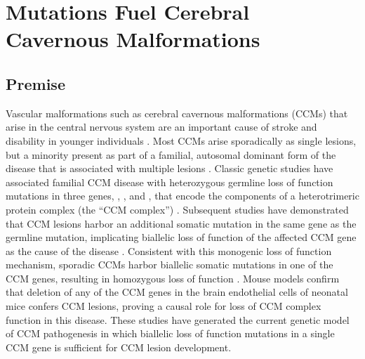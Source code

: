 \chapter{ Mutations Fuel Cerebral Cavernous Malformations}
\label{chap:pik3ca}

\clearpage

\section{Premise}
Vascular malformations such as cerebral cavernous malformations (CCMs) that arise in the central nervous system are an important cause of stroke and disability in younger individuals \citep{heiskanen1993, fischer2013}.  Most CCMs arise sporadically as single lesions, but a minority present as part of a familial, autosomal dominant form of the disease that is associated with multiple lesions \citep{cavalcanti2012}. Classic genetic studies have associated familial CCM disease with heterozygous germline loss of function mutations in three genes, , , and , that encode the components of a heterotrimeric protein complex (the “CCM complex”) \citep{fisher2014, plummer2005}. Subsequent studies have demonstrated that CCM lesions harbor an additional somatic mutation in the same gene as the germline mutation, implicating biallelic loss of function of the affected CCM gene as the cause of the disease \citep{gault2005, akers2009}. Consistent with this monogenic loss of function mechanism, sporadic CCMs harbor biallelic somatic mutations in one of the CCM genes, resulting in homozygous loss of function \citep{mcdonald2014}. Mouse models confirm that deletion of any of the CCM genes in the brain endothelial cells of neonatal mice confers CCM lesions, proving a causal role for loss of CCM complex function in this disease.  These studies have generated the current genetic model of CCM pathogenesis in which biallelic loss of function mutations in a single CCM gene is sufficient for CCM lesion development. 


